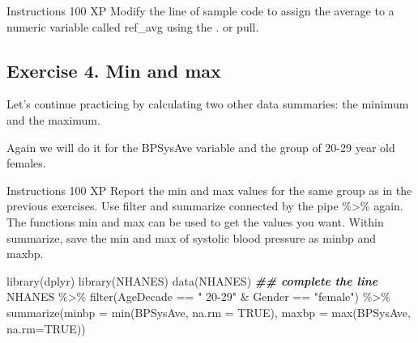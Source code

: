 \documentclass[
]{article}
\newenvironment{Shaded}{\begin{snugshade}}{\end{snugshade}}
\newcommand{\AttributeTok}[1]{\textcolor[rgb]{0.77,0.63,0.00}{#1}}
\newcommand{\ConstantTok}[1]{\textcolor[rgb]{0.00,0.00,0.00}{#1}}
\newcommand{\DocumentationTok}[1]{\textcolor[rgb]{0.56,0.35,0.01}{\textbf{\textit{#1}}}}
\newcommand{\FunctionTok}[1]{\textcolor[rgb]{0.00,0.00,0.00}{#1}}
\newcommand{\NormalTok}[1]{#1}
\newcommand{\OtherTok}[1]{\textcolor[rgb]{0.56,0.35,0.01}{#1}}
\newcommand{\SpecialCharTok}[1]{\textcolor[rgb]{0.00,0.00,0.00}{#1}}
\newcommand{\StringTok}[1]{\textcolor[rgb]{0.31,0.60,0.02}{#1}}
\begin{document}
Instructions 100 XP Modify the line of sample code to assign the average
to a numeric variable called ref\_avg using the . or pull.

\begin{Shaded}
\end{Shaded}

\hypertarget{exercise-4.-min-and-max}{%
\subsection{Exercise 4. Min and max}\label{exercise-4.-min-and-max}}

Let's continue practicing by calculating two other data summaries: the
minimum and the maximum.

Again we will do it for the BPSysAve variable and the group of 20-29
year old females.

Instructions 100 XP Report the min and max values for the same group as
in the previous exercises. Use filter and summarize connected by the
pipe \%\textgreater\% again. The functions min and max can be used to
get the values you want. Within summarize, save the min and max of
systolic blood pressure as minbp and maxbp.

\begin{Shaded}
\begin{Highlighting}[]
\FunctionTok{library}\NormalTok{(dplyr)}
\FunctionTok{library}\NormalTok{(NHANES)}
\FunctionTok{data}\NormalTok{(NHANES)}
\DocumentationTok{\#\# complete the line}
\NormalTok{NHANES }\SpecialCharTok{\%\textgreater{}\%}
      \FunctionTok{filter}\NormalTok{(AgeDecade }\SpecialCharTok{==} \StringTok{" 20{-}29"}  \SpecialCharTok{\&}\NormalTok{ Gender }\SpecialCharTok{==} \StringTok{"female"}\NormalTok{) }\SpecialCharTok{\%\textgreater{}\%}
  \FunctionTok{summarize}\NormalTok{(}\AttributeTok{minbp =} \FunctionTok{min}\NormalTok{(BPSysAve, }\AttributeTok{na.rm =} \ConstantTok{TRUE}\NormalTok{), }
            \AttributeTok{maxbp =} \FunctionTok{max}\NormalTok{(BPSysAve, }\AttributeTok{na.rm=}\ConstantTok{TRUE}\NormalTok{))}
\end{Highlighting}
\end{Shaded}
\end{document}
